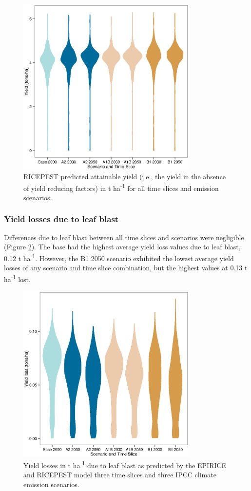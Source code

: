 \documentclass[preprint,review,12pt]{elsarticle}
\begin{document}
    \begin{figure}[H]
      \includegraphics[width = 90mm]{figures/Yield_Attainable_Violin}
      \caption{RICEPEST predicted attainable yield (i.e., the yield in the absence of yield reducing factors) in t ha\textsuperscript{-1} for all time slices and emission scenarios.}
      \label{Yield_Attainable_Violin}
    \end{figure}
    
    \subsubsection{Yield losses due to leaf blast}
    Differences due to leaf blast between all time slices and scenarios were negligible (Figure \ref{LB_Losses_Violin}). The base had the highest average yield loss values due to leaf blast, 0.12 t ha\textsuperscript{-1}. However, the B1 2050 scenario exhibited the lowest average yield losses of any scenario and time slice combination, but the highest values at 0.13 t ha\textsuperscript{-1} lost.
    
    \begin{figure}[H]
      \includegraphics[width = 90mm]{Figures/LB_Losses_Violin}
      \caption{Yield losses in t ha\textsuperscript{-1} due to leaf blast as predicted by the EPIRICE and RICEPEST model three time slices and three IPCC climate emission scenarios.}
      \label{LB_Losses_Violin}
    \end{figure}
    
\end{document}
